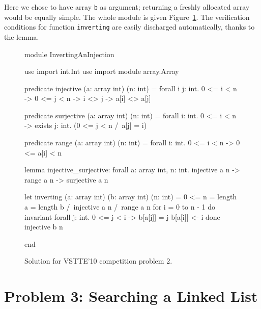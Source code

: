 Here we chose to have array \texttt{b} as argument; returning a
freshly allocated array would be equally simple.
The whole module is given Figure~\ref{fig:Inverting}.
The verification conditions for function \texttt{inverting} are easily
discharged automatically, thanks to the lemma.
\begin{figure}
  \centering
\begin{whycode}
module InvertingAnInjection

  use import int.Int
  use import module array.Array

  predicate injective (a: array int) (n: int) =
    forall i j: int. 0 <= i < n -> 0 <= j < n -> i <> j -> a[i] <> a[j]

  predicate surjective (a: array int) (n: int) =
    forall i: int. 0 <= i < n -> exists j: int. (0 <= j < n /\ a[j] = i)

  predicate range (a: array int) (n: int) =
    forall i: int. 0 <= i < n -> 0 <= a[i] < n

  lemma injective_surjective:
    forall a: array int, n: int.
    injective a n -> range a n -> surjective a n

  let inverting (a: array int) (b: array int) (n: int) =
    { 0 <= n = length a = length b /\ injective a n /\ range a n }
    for i = 0 to n - 1 do
      invariant { forall j: int. 0 <= j < i -> b[a[j]] = j }
      b[a[i]] <- i
    done
    { injective b n }

end
\end{whycode}
\vspace*{-2em}\hrulefill
  \caption{Solution for VSTTE'10 competition problem 2.}
  \label{fig:Inverting}
\end{figure}

\section{Problem 3: Searching a Linked List}

